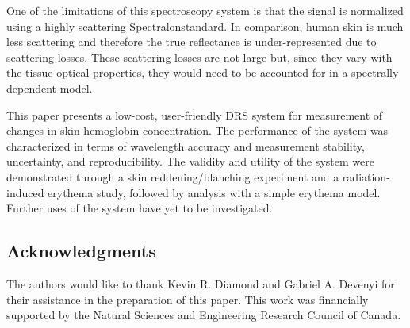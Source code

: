 One of the limitations of this spectroscopy system is that the signal is normalized using a highly scattering Spectralon\textregistered standard. In comparison, human skin is much less scattering and therefore the true reflectance is under-represented due to scattering losses. These scattering losses are not large but, since they vary with the tissue optical properties, they would need to be accounted for in a spectrally dependent model.

This paper presents a low-cost, user-friendly DRS system for measurement of changes in skin hemoglobin concentration. The performance of the system was characterized in terms of wavelength accuracy and measurement stability, uncertainty, and reproducibility. The validity and utility of the system were demonstrated through a skin reddening/blanching experiment and a radiation-induced erythema study, followed by analysis with a simple erythema model. Further uses of the system have yet to be investigated.

\subsection*{Acknowledgments}
The authors would like to thank Kevin R. Diamond and Gabriel A. Devenyi for their assistance in the preparation of this paper. This work was financially supported by the Natural Sciences and Engineering Research Council of Canada.